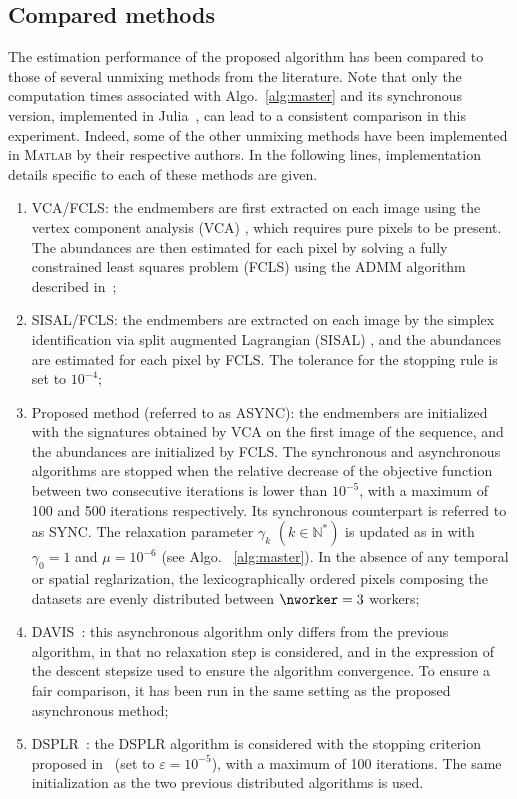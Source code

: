 \documentclass[journal,final,letterpaper,twoside,twocolumn]{IEEEtran}
\begin{document}


    \subsection{Compared methods}

The estimation performance of the proposed algorithm has been compared to those of several unmixing methods from the literature. Note that only the computation times associated with Algo.~\ref{alg:master} and its synchronous version, implemented in Julia~\cite{Bezanson2017}, can lead to a consistent comparison in this experiment. Indeed, some of the other unmixing methods have been implemented in \textsc{Matlab} by their respective authors. In the following lines, implementation details specific to each of these methods are given.
%
\begin{enumerate}
    \item VCA/FCLS: the endmembers are first extracted on each image using the vertex component analysis (VCA) \cite{Nascimento2005}, which requires pure pixels to be present. The abundances are then estimated for each pixel by solving a fully constrained least squares problem (FCLS) using the ADMM algorithm described in~\cite{Bioucas2010};
    \item SISAL/FCLS: the endmembers are extracted on each image by the simplex identification via split augmented Lagrangian (SISAL) \cite{Bioucas2009}, and the abundances are estimated for each pixel by FCLS. The tolerance for the stopping rule is set to $10^{-4}$;
    \item Proposed method (referred to as ASYNC): the endmembers are initialized with the signatures obtained by VCA on the first image of the sequence, and the abundances are initialized by FCLS. The synchronous and asynchronous algorithms are stopped when the relative decrease of the objective function between two consecutive iterations is lower than $10^{-5}$, with a maximum of 100 and 500 iterations respectively. Its synchronous counterpart is referred to as SYNC. The relaxation parameter $\gamma_k$ $(k \in \mathbb{N}^*)$ is updated as in \cite{Cannelli2016} with $\gamma_0 = 1$ and $\mu = 10^{-6}$ (see Algo. ~\ref{alg:master}). In the absence of any temporal or spatial reglarization, the lexicographically ordered pixels composing the datasets are evenly distributed between $\nworker = 3$ workers;
    \item DAVIS~\cite{Davis2016}: this asynchronous algorithm only differs from the previous algorithm, in that no relaxation step is considered, and in the expression of the descent stepsize used to ensure the algorithm convergence. To ensure a fair comparison, it has been run in the same setting as the proposed asynchronous method;
    \item DSPLR~\cite{Tsinos2017}: the DSPLR algorithm is considered with the stopping criterion proposed in~\cite{Tsinos2017} (set to $\varepsilon = 10^{-5}$), with a maximum of 100 iterations. The same initialization as the two previous distributed algorithms is used.
\end{enumerate}
\end{document}
